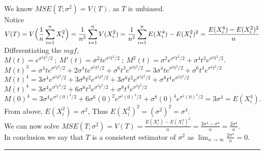 \documentclass[12pt]{article}
\newcommand{\XB}{\color{black}}
\newcommand{\XV}{\color{violet}}
\begin{document}
\noindent 
We know $ MSE(T; \sigma^{2}) = V(T) $. as $ T $ is unbiased. \\

\noindent
Notice $ \displaystyle V(T) = V\Bigl( \frac{1}{n} \sum_{i=1}^{n} X_{i}^{2} \Bigr) = \frac{1}{n^{2}} \sum_{i=1}^{n} V(X_{i}^{2}) = \frac{1}{n^{2}} \sum_{i=1}^{n} E(X_{i}^{4}) - E(X_{i}^{2})^{2} = \frac{E(X_{i}^{4}) - E(X_{i}^{2})^{2}}{n} $ \\

\noindent
Differentiating the $ mgf $, $ \displaystyle M(t) = e^{\sigma^{2}t^{2}/2} \ ; \ M'(t) = \sigma^{2}te^{\sigma^{2}t^{2}/2} \ ; \ M^{2}(t) = \sigma^{2}e^{\sigma^{2}t^{2}/2} + \sigma^{4}t^{2}e^{\sigma^{2}t^{2}/2} $.\\

$ \displaystyle M(t)^{3} = \sigma^{4}te^{\sigma^{2}t^{2}/2} + 2\sigma^{4}te^{\sigma^{2}t^{2}/2} + \sigma^{6}t^{3}e^{\sigma^{2}t^{2}/2} = 3\sigma^{4}te^{\sigma^{2}t^{2}/2} + \sigma^{6}t^{3}e^{\sigma^{2}t^{2}/2} $ \\

$ \displaystyle M(t)^{4} = 3\sigma^{4}e^{\sigma^{2}t^{2}/2} + 3\sigma^{6}t^{2}e^{\sigma^{2}t^{2}/2} + 3\sigma^{6}t^{2}e^{\sigma^{2}t^{2}/2} + \sigma^{8}t^{4}e^{\sigma^{2}t^{2}/2} $ \\

$ \displaystyle M(t)^{4} = 3\sigma^{4}e^{\sigma^{2}t^{2}/2} + 6\sigma^{6}t^{2}e^{\sigma^{2}t^{2}/2} + \sigma^{8}t^{4}e^{\sigma^{2}t^{2}/2} $ \\

$ \displaystyle M(0)^{4} = 3\sigma^{4}e^{\sigma^{2}(0)^{2}/2} + 6\sigma^{6}(0)^{2}e^{\sigma^{2}(0)^{2}/2} + \sigma^{8}(0)^{4}e^{\sigma^{2}(0)^{2}/2} = 3\sigma^{4} = E(X_{i}^{4}). $ \\

\noindent
From above, $ E(X_{i}^{2}) = \sigma^{2} $, Thus $ E(X_{i}^{2})^{2} = (\sigma^{2})^{2} = \sigma^{4} $. \\ 

\noindent
We can now solve $ \displaystyle MSE(T; \sigma^{2}) = V(T) = \frac{E(X_{i}^{4}) - E(X_{i}^{2})^{2}}{n} = \frac{3\sigma^{4} - \sigma^{4}}{n} = \frac{2\sigma^{4}}{n} $. \\

\noindent
In conclusion we say that $ T $ is a consistent estimator of $ \sigma^{2} $ as $ \displaystyle \lim_{n \to \infty} \frac{2\sigma^{4}}{n} = 0 $. \\  

\XV
\hspace{25mm}\rule{100mm}{0.11mm}\XB \\
\end{document}
